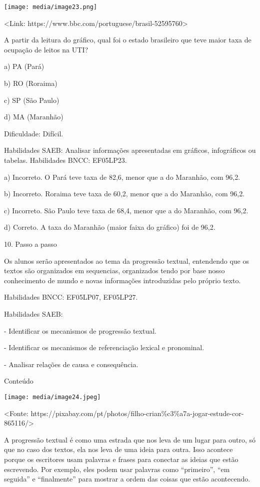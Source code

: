 \texttt{[image: media/image23.png]}

\textless{}Link:
https://www.bbc.com/portuguese/brasil-52595760\textgreater{}

A partir da leitura do gráfico, qual foi o estado brasileiro que teve
maior taxa de ocupação de leitos na UTI?

a) PA (Pará)

b) RO (Roraima)

c) SP (São Paulo)

d) MA (Maranhão)

Dificuldade: Difícil.

Habilidades SAEB: Analisar informações apresentadas em gráficos,
infográficos ou tabelas. Habilidades BNCC: EF05LP23.

a) Incorreto. O Pará teve taxa de 82,6, menor que a do Maranhão, com
96,2.

b) Incorreto. Roraima teve taxa de 60,2, menor que a do Maranhão, com
96,2.

c) Incorreto. São Paulo teve taxa de 68,4, menor que a do Maranhão, com
96,2.

d) Correto. A taxa do Maranhão (maior faixa do gráfico) foi de 96,2.

10. Passo a passo

Os alunos serão apresentados ao tema da progressão textual, entendendo
que os textos são organizados em sequencias, organizados tendo por base
nosso conhecimento de mundo e novas informações introduzidas pelo
próprio texto.

Habilidades BNCC: EF05LP07, EF05LP27.

Habilidades SAEB:

- Identificar os mecanismos de progressão textual.

- Identificar os mecanismos de referenciação lexical e pronominal.

- Analisar relações de causa e consequência.

Conteúdo

\texttt{[image: media/image24.jpeg]}

\textless{}Fonte:
https://pixabay.com/pt/photos/filho-crian\%c3\%a7a-jogar-estude-cor-865116/\textgreater{}

A progressão textual é como uma estrada que nos leva de um lugar para
outro, só que no caso dos textos, ela nos leva de uma ideia para outra.
Isso acontece porque os escritores usam palavras e frases para conectar
as ideias que estão escrevendo. Por exemplo, eles podem usar palavras
como ``primeiro'', ``em seguida'' e ``finalmente'' para mostrar a ordem
das coisas que estão acontecendo.

